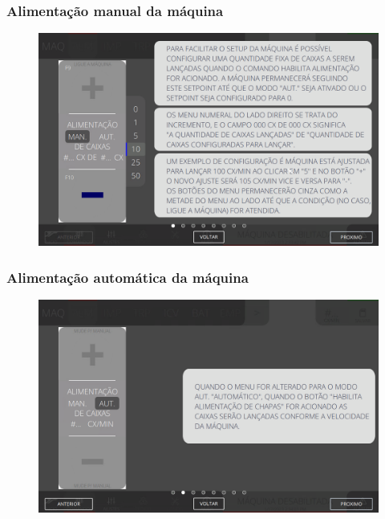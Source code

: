 \subsubsection{\small{Alimentação manual da máquina}} \label{sec:telaComandoAlimentacaoAlimentacaoManualDaMaquina}
\vspace*{\fill}
\begin{figure}[h]
    \centering
    \includegraphics[width=576 px,height=360 px]{src/imagesICV/03-feeder/commands/2.png}
\end{figure}
\vspace*{\fill}

\newpage
\thispagestyle{fancy}
\vspace*{40 pt}
\subsubsection{\small{Alimentação automática da máquina}} \label{sec:telaComandoAlimentacaoAlimentacaoAutomaticaDaMaquina}
\vspace*{\fill}
\begin{figure}[h]
    \centering
    \includegraphics[width=576 px,height=360 px]{src/imagesICV/03-feeder/commands/3.png}
\end{figure}
\vspace*{\fill}

